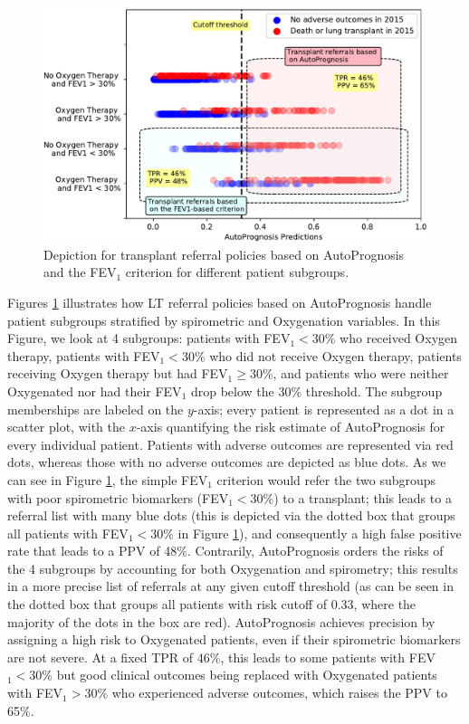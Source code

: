 \documentclass [PhD] {uclathes}
\begin{document}
\begin{figure}[t]
\centering
\includegraphics[width=5in]{ch6Fig7.pdf}
\caption{Depiction for transplant referral policies based on AutoPrognosis and the FEV$_1$ criterion for different patient subgroups.}
\label{ch6fig7}
\end{figure}

Figures \ref{ch6fig7} illustrates how LT referral policies based on AutoPrognosis handle patient subgroups stratified by spirometric and Oxygenation variables. In this Figure, we look at 4 subgroups: patients with FEV$_1<30\%$ who received Oxygen therapy, patients with FEV$_1<30\%$ who did not receive Oxygen therapy, patients receiving Oxygen therapy but had FEV$_1\geq 30\%$, and patients who were neither Oxygenated nor had their FEV$_1$ drop below the 30$\%$ threshold. The subgroup memberships are labeled on the $y$-axis; every patient is represented as a dot in a scatter plot, with the $x$-axis quantifying the risk estimate of AutoPrognosis for every individual patient. Patients with adverse outcomes are represented via red dots, whereas those with no adverse outcomes are depicted as blue dots. As we can see in Figure \ref{ch6fig7}, the simple FEV$_1$ criterion would refer the two subgroups with poor spirometric biomarkers (FEV$_1<30\%$) to a transplant; this leads to a referral list with many blue dots (this is depicted via the dotted box that groups all patients with FEV$_1<30\%$ in Figure \ref{ch6fig7}), and consequently a high false positive rate that leads to a PPV of 48$\%$. Contrarily, AutoPrognosis orders the risks of the 4 subgroups by accounting for both Oxygenation and spirometry; this results in a more precise list of referrals at any given cutoff threshold (as can be seen in the dotted box that groups all patients with risk cutoff of 0.33, where the majority of the dots in the box are red). AutoPrognosis achieves precision by assigning a high risk to Oxygenated patients, even if their spirometric biomarkers are not severe. At a fixed TPR of 46$\%$, this leads to some patients with FEV$_1<30\%$ but good clinical outcomes being replaced with Oxygenated patients with FEV$_1>30\%$ who experienced adverse outcomes, which raises the PPV to 65$\%$.
\end{document}
